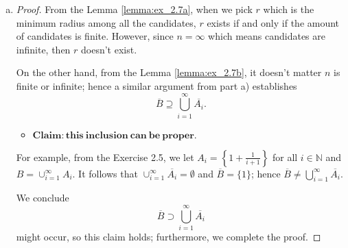 \begin{Exercise}
\begin{enumerate}[a)]
\begin{proof}
For $n=1$, if $B_1 = A_1$, then $\overline{B_1} = \overline{A_1}$ holds.

Suppose for $n=k$, 
$$
B_k = \bigcup_{i=1}^{k}A_i \implies \overline{B_k} = \bigcup_{i=1}^{k}\overline{A_i}.
$$
Then for $n=k+1$, if $B_{k+1} = \bigcup_{i=1}^{k+1}A_i$, then we have
\begin{align*}
\overline{B_{k+1}}
&= \overline{\cup_{i=1}^{k+1}A_i} \\
&= \overline{\left( \cup_{i=1}^{k}A_i \right) \cup A_{k+1}} \\
&= \overline{\cup_{i=1}^{k}A_i} \cup \overline{A_{k+1}} \\
&= \overline{B_k} \cup \overline{A_{k+1}} \\
&= \left( \cup_{i=1}^{k}\overline{A_i} \right) \cup \overline{A_{k+1}} \\
&= \cup_{i=1}^{k+1}\overline{A_i}
\end{align*}
also holds. 

By induction, we conclude the formula holds for all $n\in\mathbb{N}$.
\end{proof}

\item
\begin{proof}
From the Lemma \ref{lemma:ex_2.7a}, when we pick $r$ which is the minimum radius among all the candidates, $r$ exists if and only if the amount of candidates is finite. However, since $n=\infty$ which means candidates are infinite, then $r$ doesn't exist.

On the other hand, from the Lemma \ref{lemma:ex_2.7b}, it doesn't matter $n$ is finite or infinite; hence a similar argument from part a) establishes
$$
\overline{B} \supseteq \bigcup_{i=1}^{\infty}\overline{A_i}.
$$

\begin{itemize}
\item $\mathbf{Claim:this\ inclusion\ can\ be\ proper.}$
\end{itemize}

For example, from the Exercise 2.5, we let $A_i = \left\{ 1+\frac{1}{i+1} \right\}$ for all $i\in\mathbb{N}$ and $B=\cup_{i=1}^{\infty} A_i$. It follows that $\cup_{i=1}^{\infty}\overline{A_i} = \emptyset$ and $\overline{B} = \{1\}$; hence $\overline{B} \neq \bigcup_{i=1}^{\infty}\overline{A_i}$.

We conclude
$$
\overline{B} \supset \bigcup_{i=1}^{\infty}\overline{A_i}
$$
might occur, so this claim holds; furthermore, we complete the proof.
\end{proof}
\end{enumerate}
\end{Exercise}